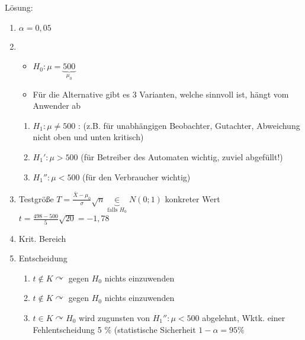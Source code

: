 \documentclass[a4paper]{scrartcl}
\begin{document}
Lösung:
\begin{enumerate}
\item $\alpha = 0,05$
\item \begin{itemize}
    \item $H_0 : \mu = \underbrace{500}_{\mu_0}$
    \item Für die Alternative gibt es 3 Varianten, welche sinnvoll ist, hängt vom Anwender ab
    \end{itemize}
    \begin{enumerate}
    \item $H_1:  \mu \neq 500$ : (z.B. für unabhängigen Beobachter, Gutachter, Abweichung nicht oben und unten kritisch)
    \item $H_1' : \mu > 500$ (für Betreiber des Automaten wichtig, zuviel abgefüllt!)
    \item $H_1'' : \mu < 500$ (für den Verbraucher wichtig)
    \end{enumerate}
    
\item Testgröße $T =  \frac{\bar{X} - \mu_0 }{\sigma} \sqrt{n} \underbrace{\in}_{\text{falls } H_0} N (0;1)$ konkreter Wert $t= \frac{498 - 500}{5} \sqrt{20} = -1,78$
\item Krit. Bereich %
\item Entscheidung
\begin{enumerate}
\item $t \notin K \curvearrowright$ gegen $H_0$ nichts einzuwenden
\item $t \notin K \curvearrowright$ gegen $H_0$ nichts einzuwenden
\item $t \in K \curvearrowright H_0$ wird zugunsten von $H_1'' : \mu < 500$ abgelehnt, Wktk. einer Fehlentscheidung 5 \% (statistische Sicherheit $1-\alpha = 95 \%$
\end{enumerate}
\end{enumerate}
\end{document}
